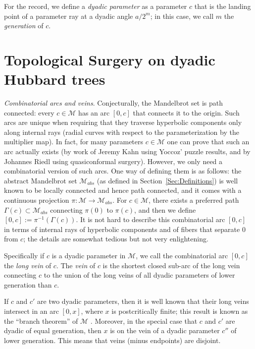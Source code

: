 \documentclass[12pt]{amsart}
\newcommand{\M}{\mathscr M}
\newcommand{\0}{\texttt{0}}
\newcommand{\1}{\texttt{1}}
\theoremstyle{definition}
\numberwithin{equation}{section}
\begin{document}
For the record, we define a \emph{dyadic parameter} as a parameter $c$ that is the landing point of a parameter ray at a dyadic angle $a/2^m$; in this case, we call $m$ the \emph{generation} of $c$. 






\section{Topological Surgery on dyadic Hubbard trees}
\label{Sec:TopSurgery}

\emph{Combinatorial arcs and veins}.
Conjecturally, the Mandelbrot set is path connected: every $c\in\M$ has an arc $[0,c]$ that connects it to the origin. Such arcs are unique when requiring that they traverse hyperbolic components only along internal rays (radial curves with respect to the parameterization by the multiplier map). In fact, for many parameters $c\in\M$ one can prove that such an arc actually exists (by work of Jeremy Kahn using Yoccoz' puzzle results, and by Johannes Riedl using quasiconformal surgery). However, we only need a combinatorial version of such arcs. One way of defining them is as follows: the abstract Mandelbrot set $\M_{abs}$ (as defined in Section~\ref{Sec:Definitions}) is well known to be locally connected and hence path connected, and it comes with a continuous projection $\pi\colon\M\to\M_{abs}$. For $c\in\M$, there exists a preferred path $\Gamma(c)\subset\M_{abs}$ connecting $\pi(0)$ to $\pi(c)$, and then we define $[0,c]:=\pi^{-1}(\Gamma(c))$. It is not hard to describe this combinatorial arc $[0,c]$ in terms of internal rays of hyperbolic components and of fibers that separate $0$ from $c$; the details are somewhat tedious but not very enlightening. 





Specifically if $c$ is a dyadic parameter in $\M$, we call the combinatorial arc $[0,c]$ the \emph{long vein} of $c$. 
The \emph{vein} of $c$ is the shortest closed sub-arc of the long vein connecting $c$ to the union of the long veins of all dyadic parameters of lower generation than $c$.

 If $c$ and $c'$ are two dyadic parameters, then it is well known that their long veins intersect in an arc $[0,x]$, where $x$ is postcritically finite; this result is known as the ``branch theorem'' of $\M$ \cite{Orsay,MandelBranch}. Moreover, in the special case that $c$ and $c'$ are dyadic of equal generation, then $x$ is on the vein of a dyadic parameter $c''$ of lower generation. This means that veins (minus endpoints) are disjoint. 
 
\end{document}
